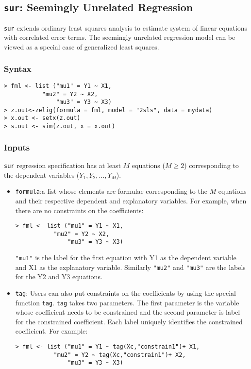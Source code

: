 \documentclass[12pt]{book}%
\begin{document}
\subsection{\texttt{sur}: Seemingly Unrelated Regression}
\label{sur}
\texttt{sur} extends ordinary least squares analysis to estimate system of linear 
equations with correlated error terms. The seemingly unrelated regression model can
be viewed as a special case of generalized least squares.
\subsubsection{Syntax}
\begin{verbatim}
> fml <- list ("mu1" = Y1 ~ X1,
	       "mu2" = Y2 ~ X2,
               "mu3" = Y3 ~ X3)
> z.out<-zelig(formula = fml, model = "2sls", data = mydata)
> x.out <- setx(z.out)
> s.out <- sim(z.out, x = x.out)
\end{verbatim}
\subsubsection{Inputs}
\texttt{sur} regression specification has at least $M$ equations 
($M \ge 2$) corresponding to the dependent variables ($Y_1, Y_2, \ldots, Y_M$).
\begin{itemize}
\item \texttt{formula}:a list whose elements are formulae corresponding to 
the $M$ equations and their respective dependent and explanatory variables.
For example, when there are no constraints on the coefficients:
\begin{verbatim}
> fml <- list ("mu1" = Y1 ~ X1,
	       "mu2" = Y2 ~ X2,
               "mu3" = Y3 ~ X3)
\end{verbatim}
\texttt{"mu1"} is the label for the first equation with Y1 as the dependent variable
and X1 as the explanatory variable. Similarly \texttt{"mu2"} and \texttt{"mu3"} are the
labels for the Y2 and Y3 equations.
\item \texttt{tag}: Users can also put constraints on the coefficients by using
the special function \texttt{tag}. \texttt{tag} takes two parameters. The first
parameter is the variable whose coefficient needs to be constrained and the second
parameter is label for the constrained coefficient. Each label uniquely identifies
the constrained coefficient. For example:
\begin{verbatim}
> fml <- list ("mu1" = Y1 ~ tag(Xc,"constrain1")+ X1,
	       "mu2" = Y2 ~ tag(Xc,"constrain1")+ X2,
               "mu3" = Y3 ~ X3)
\end{verbatim}
\end{itemize}
\end{document}
